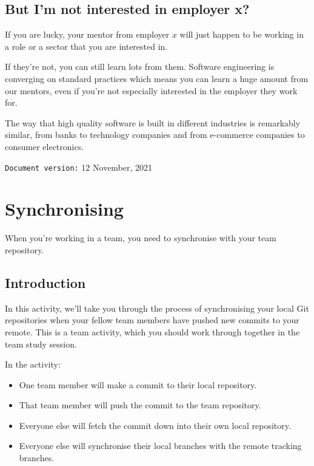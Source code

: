 \documentclass[
]{book}
\providecommand{\tightlist}{%
  \setlength{\itemsep}{0pt}\setlength{\parskip}{0pt}}
\begin{document}
\hypertarget{dontcare}{%
\section{But I'm not interested in employer x?}\label{dontcare}}

If you are lucky, your mentor from employer \(x\) will just happen to be working in a role or a sector that you are interested in.

If they're not, you can still learn lots from them. Software engineering is converging on standard practices which means you can learn a huge amount from our mentors, even if you're not especially interested in the employer they work for.

The way that high quality software is built in different industries is remarkably similar, from banks to technology companies and from e-commerce companies to consumer electronics.

\texttt{Document\ version:} 12 November, 2021

\hypertarget{syncing}{%
\chapter{Synchronising}\label{syncing}}

When you're working in a team, you need to synchronise with your team repository.

\hypertarget{syncintro}{%
\section{Introduction}\label{syncintro}}

In this activity, we'll take you through the process of synchronising your local Git repositories when your fellow team members have pushed new commits to your remote. This is a team activity, which you should work through together in the team study session.

In the activity:

\begin{itemize}
\tightlist
\item
  One team member will make a commit to their local repository.
\item
  That team member will push the commit to the team repository.
\item
  Everyone else will fetch the commit down into their own local repository.
\item
  Everyone else will synchronise their local branches with the remote tracking branches.
\end{itemize}
\end{document}
